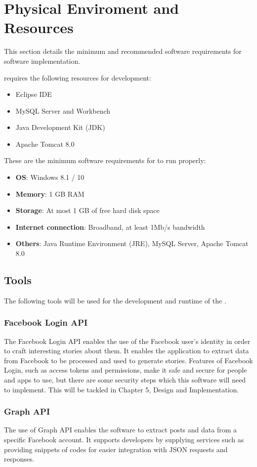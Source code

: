 \section{Physical Enviroment and Resources}
This section details the minimum and recommended software requirements for software implementation.

\systemname requires the following resources for development:
\begin{itemize}
\item Eclipse IDE
\item MySQL Server and Workbench
\item Java Development Kit (JDK)
\item Apache Tomcat 8.0
\end{itemize}

These are the minimum software requirements for \systemname to run properly:
\begin{itemize}
\item \textbf{OS}: Windows 8.1 / 10
\item \textbf{Memory}: 1 GB RAM
\item \textbf{Storage}: At most 1 GB of free hard disk space
\item \textbf{Internet connection}: Broadband, at least 1Mb/s bandwidth
\item \textbf{Others}: Java Runtime Environment (JRE), MySQL Server, Apache Tomcat 8.0
\end{itemize}

\subsection{Tools}
The following tools will be used for the development and runtime of the \systemname.

\subsubsection{Facebook Login API}
The Facebook Login API enables the use of the Facebook user's identity in order to craft interesting stories about them. It enables the application to extract data from Facebook to be processed and used to generate stories. Features of Facebook Login, such as access tokens and permissions, make it safe and secure for people and apps to use, but there are some security steps which this software will need to implement. This will be tackled in Chapter 5, Design and Implementation.

\subsubsection{Graph API}
The use of Graph API enables the software to extract posts and data from a specific Facebook account. It supports developers by supplying services such as providing snippets of codes for easier integration with JSON requests and responses.

